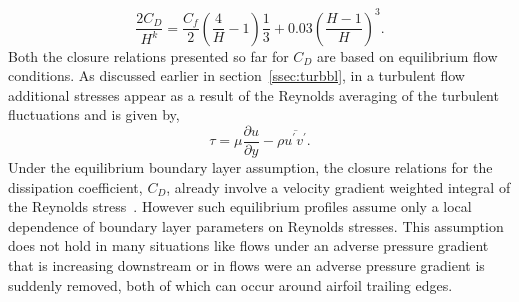\begin{equation}
\frac{2C_D}{H^k} = \frac{C_f}{2}\left(\frac{4}{H}-1\right)\frac{1}{3} + 0.03\left(\frac{H-1}{H}\right)^3.
\end{equation}
Both the closure relations presented so far for $C_D$ are based on equilibrium flow conditions. 
As discussed earlier in section~\ref{ssec:turbbl}, in a turbulent flow additional stresses appear as a result of the Reynolds averaging of the turbulent fluctuations and is given by,
\begin{equation}
\tau = \mu\frac{\partial u}{\partial y} - \rho \overline{u^{\prime}v^{\prime}}.
\label{eq:tauturb}
\end{equation}
Under the equilibrium boundary layer assumption, the closure relations for the dissipation coefficient, $C_D$, already involve a velocity gradient weighted integral of the Reynolds stress~\cite{drelaphdthesis}. However such equilibrium profiles assume only a local dependence of boundary layer parameters on Reynolds stresses. This assumption does not hold in many situations like flows under an adverse pressure gradient that is increasing downstream or in flows were an adverse pressure gradient is suddenly removed, both of which can occur around airfoil trailing edges.

